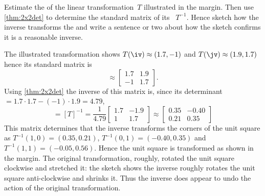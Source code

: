\begin{example} 
Estimate the  of the linear transformation~\(T\) illustrated in the margin.  
%
Then use \cref{thm:2x2det} to determine the standard matrix of its 
~\(T^{-1}\).
Hence sketch how the inverse transforms the  and write a sentence or two about how the sketch confirms it is a reasonable inverse. 
\begin{solution} 
The illustrated transformation shows \(T(\iv)\approx(1.7,-1)\) and \(T(\jv)\approx(1.9,1.7)\) hence its standard matrix is
\begin{equation*}
[T]\approx\begin{bmatrix} 1.7&1.9\\-1&1.7 \end{bmatrix}.
\end{equation*}
Using \cref{thm:2x2det} the inverse of this matrix is, since its determinant\({}=1.7\cdot1.7-(-1)\cdot1.9=4.79\),
\begin{equation*}
[T^{-1}]=[T]^{-1}
=\frac1{4.79} \begin{bmatrix} 1.7&-1.9\\1&1.7 \end{bmatrix}
\approx\begin{bmatrix} 0.35&-0.40\\0.21&0.35 \end{bmatrix}
\end{equation*}
This matrix determines that the inverse transforms the corners of the unit square as \(T^{-1}(1,0)=(0.35,0.21)\), \(T^{-1}(0,1)=(-0.40,0.35)\) and \(T^{-1}(1,1)=(-0.05,0.56)\).
%
Hence the unit square is transformed as shown in the margin.
The original transformation, roughly, rotated the unit square clockwise and stretched it: the sketch shows the inverse roughly rotates the unit square anti-clockwise and shrinks it.  
Thus the inverse does appear to undo the action of the original transformation.
\end{solution}
\end{example}




